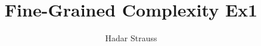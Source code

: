 \documentclass[11pt]{article}
\theoremstyle{sltheorem}
\begin{document}
\title{ Fine-Grained Complexity Ex1 }
\author{Hadar Strauss}
\maketitle





\printbibliography[heading=bibintoc]{}
\end{document}
